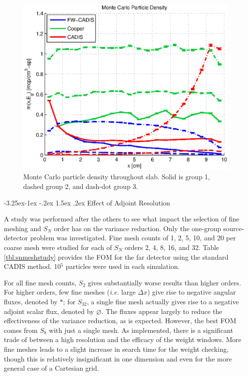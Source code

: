 \documentclass[letter,11pt]{article}
\makeatletter
\renewcommand\subsection{\@startsection{subsection}{2}{\z@}%
                                {-3.25ex\@plus -1ex \@minus -.2ex}%
                                {1.5ex \@plus .2ex}%
                                {\normalfont\itshape\bf}}
\newcommand{\ie}{{\it i.e. }}
\makeatother
\begin{document}
\begin{figure}[!] 
   \centering
   \includegraphics[keepaspectratio, width = 4.0 in]{3gmcps}
   \caption{Monte Carlo particle density throughout slab.  Solid is group 1, dashed group 2, and dash-dot group 3.}
   \label{fig:3gmcps}
\end{figure}

\subsection{Effect of Adjoint Resolution}

A study was performed after the others to see what impact the selection of fine meshing and $S_N$ order has on the variance reduction.  Only the one-group source-detector problem was investigated.  Fine mesh counts of 1, 2, 5, 10, and 20 per coarse mesh were studied for each of $S_N$ orders 2, 4, 8, 16, and 32.  Table \ref{tbl:snmeshstudy} provides the FOM for the far detector using the standard CADIS method.  10$^5$ particles were used in each simulation.

For all fine mesh counts, $S_2$ gives substantially worse results than higher orders.  For higher orders, few fine meshes (\ie large $\Delta x$) give rise to negative angular fluxes, denoted by $*$; for $S_{32}$, a single fine mesh actually gives rise to a negative adjoint scalar flux, denoted by $\varnothing$.  The fluxes appear largely to reduce the effectiveness of the variance reduction, as is expected.  However, the best FOM comes from $S_8$ with just a single mesh.  As implemented, there is a significant trade of between a high resolution and the efficacy of the weight windows.  More fine meshes leads to a slight increase in search time for the weight checking, though this is relatively insignificant in one dimension and even for the more general case of a Cartesian grid.  
\end{document}
